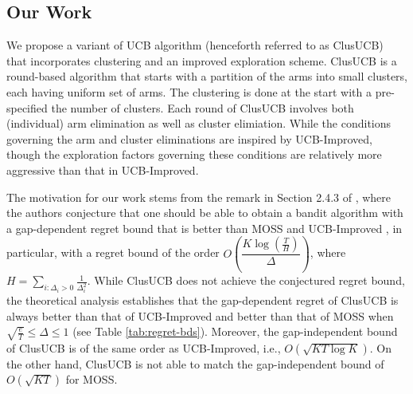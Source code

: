 \subsection*{Our Work}
We propose a variant of UCB algorithm (henceforth referred to as ClusUCB) that incorporates clustering and an improved exploration scheme. ClusUCB is a round-based algorithm that
starts with a partition of the arms into small clusters, each having uniform set of arms. 
The clustering is done at the start with a pre-specified the number of clusters. 
Each round of ClusUCB involves both (individual) arm elimination as well as cluster elimiation. While the conditions governing the arm and cluster eliminations are inspired by UCB-Improved, though the exploration factors governing these conditions are relatively more aggressive than that in UCB-Improved. 

The motivation for our work stems from the remark in Section 2.4.3 of \cite{bubeck2012bandits}, where the authors conjecture that one should be able to obtain a bandit algorithm with a
gap-dependent regret bound that is better than MOSS \cite{audibert2009minimax} and UCB-Improved \cite{auer2010ucb}, in particular, with a regret bound of the order 
$O\left(\dfrac{K\log (\frac{T}{H})}{\Delta}\right)$, where $H = \sum_{i:\Delta_i>0} \frac{1}{\Delta_i^2}$. While ClusUCB does not achieve the conjectured regret bound, 
the theoretical analysis establishes
that the gap-dependent regret of ClusUCB is always better than that of UCB-Improved and better than that of MOSS when $\sqrt{\frac{e}{T}} \leq \Delta\leq 1$ (see Table \ref{tab:regret-bds}). Moreover, the gap-independent bound of ClusUCB is of the same order as UCB-Improved, i.e., $O\left(\sqrt{KT\log K}\right)$. On the other hand, ClusUCB is not able to match the gap-independent bound of $O(\sqrt{KT})$ for MOSS.




